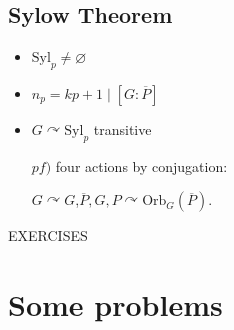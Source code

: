 \documentclass{article}
\let\realsection\section
\renewcommand\section{\newpage\realsection}
\begin{document}
\subsection*{Sylow Theorem}

\begin{itemize}
\item $\text{Syl}_p\ne\varnothing$
\item $n_p=kp+1\mid\left[G:\overline P\right]$
\item $G\curvearrowright\text{Syl}_p$ transitive
	\par $pf)$ four actions by conjugation:
	\par\quad $G\curvearrowright G$,\quad $\overline P,G,P\curvearrowright\text{Orb}_G(\overline P)$.
\end{itemize}

\bigskip
EXERCISES

\section{Some problems}
\end{document}
